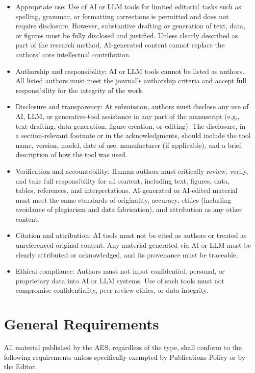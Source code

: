 \documentclass[fleqn,draft]{jaes}
\begin{document}
\begin{itemize}
  \item Appropriate use:
  Use of AI or LLM tools for limited editorial tasks such as spelling, grammar, or formatting corrections is permitted and does not require disclosure. However, substantive drafting or generation of text, data, or figures must be fully disclosed and justified.
  Unless clearly described as part of the research method, AI-generated content cannot replace the authors’ core intellectual contribution.
  
  \item Authorship and responsibility:
  AI or LLM tools cannot be listed as authors. All listed authors must meet the journal’s authorship criteria and accept full responsibility for the integrity of the work.
  
  \item Disclosure and transparency:
  At submission, authors must disclose any use of AI, LLM, or generative-tool assistance in any part of the manuscript (e.g., text drafting, data generation, figure creation, or editing). The disclosure, in a section-relevant footnote or in the acknowledgments, should include the tool name, version, model, date of use, manufacturer (if applicable), and a brief description of how the tool was used.

  \item Verification and accountability:
  Human authors must critically review, verify, and take full responsibility for all content, including text, figures, data, tables, references, and interpretations. AI-generated or AI-edited material must meet the same standards of originality, accuracy, ethics (including avoidance of plagiarism and data fabrication), and attribution as any other content.

  \item Citation and attribution:
  AI tools must not be cited as authors or treated as unreferenced original content.   Any material generated via AI or LLM must be clearly attributed or acknowledged, and its provenance must be traceable.

  \item Ethical compliance:
  Authors must not input confidential, personal, or proprietary data into AI or LLM systems.
  Use of such tools must not compromise confidentiality, peer-review ethics, or data integrity.
\end{itemize}

\section{General Requirements}\label{sec:general}
All material published by the AES, regardless of the type, shall conform to the following requirements unless specifically exempted by Publications Policy or by the Editor.
\end{document}
